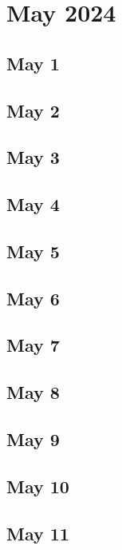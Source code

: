 %
%
%

\chapter{May 2024}
\label{intro} %

\section{May 1}

\section{May 2}

\section{May 3}

\section{May 4}

\section{May 5}

\section{May 6}

\section{May 7}

\section{May 8}

\section{May 9}

\section{May 10}

\section{May 11}

